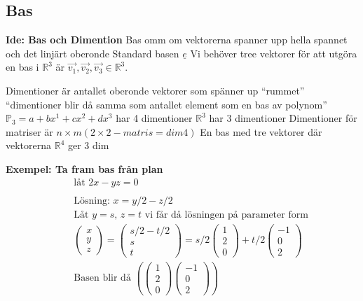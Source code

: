 \begin{multicols}{2}
\section{Bas}
\textbf{Ide: Bas och Dimention}
Bas omm om vektorerna spanner upp hella spannet och det linjärt oberonde
Standard basen $\underline{e}$
Vi behöver tree vektorer för att utgöra en bas i $\mathbb{R}^3$ är
$\vec{v_1}, \vec{v_2}, \vec{v_3} \in\mathbb{R}^3$.

Dimentioner är antallet oberonde vektorer som spänner up ``rummet''
``dimentioner blir då samma som antallet element som en bas av polynom''
$\mathbb{P}_3 = a + bx^1 + cx^2 + dx^3$ har 4 dimentioner
$\mathbb{R}^3$ har 3 dimentioner
Dimentioner för matriser är $n\times m (2\times{2}-matris = dim 4)$
En bas med tre vektorer där vektorerna $\mathbb{R}^4$ ger 3 dim

\textbf{Exempel: Ta fram bas från plan}
\begin{align*}
  &\quad  \text{låt } 2x -y z = 0 \\
  &\quad  \\
  &\quad  \text{Lösning: }  x=y/2 -z/2 \\
  &\quad  \text{Låt } y=s, \, z=t \text{ vi får då lösningen på parameter form} \\
  &\quad  \begin{pmatrix} x \\ y \\ z \end{pmatrix} =
  \begin{pmatrix} s/2 -t/2 \\ s \\ t \end{pmatrix} =
  s/2\begin{pmatrix} 1 \\ 2 \\ 0 \end{pmatrix} +
  t/2\begin{pmatrix} -1 \\ 0 \\ 2 \end{pmatrix} \\
  &\quad  \text{Basen blir då }
  \left( \begin{pmatrix} 1 \\ 2 \\ 0 \end{pmatrix} \begin{pmatrix} -1 \\ 0 \\ 2 \end{pmatrix} \right) \\
\end{align*}



\end{multicols}
